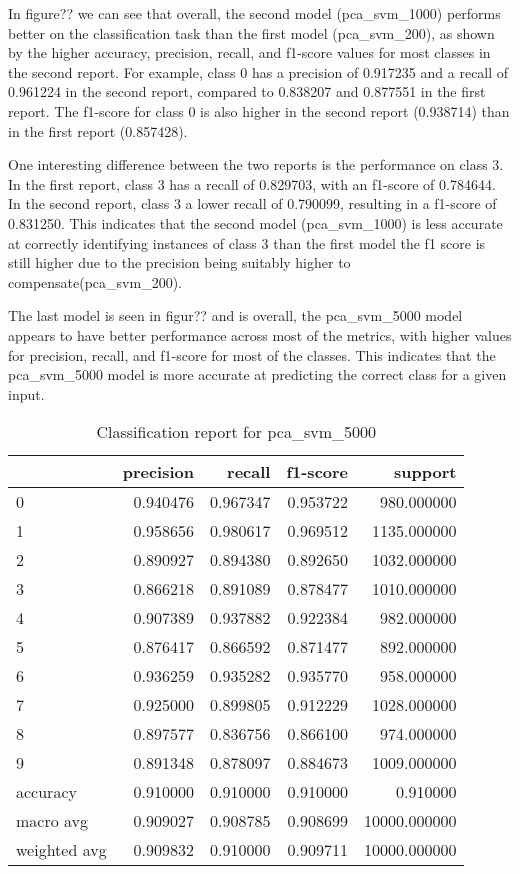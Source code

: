 In figure?? we can see that overall, the second model (pca_svm_1000) performs better on the classification task than the first model (pca_svm_200), as shown by the higher accuracy, precision, recall, and f1-score values for most classes in the second report. For example, class 0 has a precision of 0.917235 and a recall of 0.961224 in the second report, compared to 0.838207 and 0.877551 in the first report. The f1-score for class 0 is also higher in the second report (0.938714) than in the first report (0.857428).

One interesting difference between the two reports is the performance on class 3. In the first report, class 3 has a recall of 0.829703, with an f1-score of 0.784644. In the second report, class 3 a lower recall of 0.790099, resulting in a f1-score of 0.831250. This indicates that the second model (pca_svm_1000) is less accurate at correctly identifying instances of class 3 than the first model the f1 score is still higher due to the precision being suitably higher to compensate(pca_svm_200).

The last model is seen in figur?? and is overall, the pca_svm_5000 model appears to have better performance across most of the metrics, with higher values for precision, recall, and f1-score for most of the classes. This indicates that the pca_svm_5000 model is more accurate at predicting the correct class for a given input.

\begin{table}[htb!]
    \centering
    \caption{Classification report for pca_svm_5000}
    \label{tab:classification-report-pca_svm_5000}
    \begin{tabular}{lrrrr}
    \toprule
     & precision & recall & f1-score & support \\
    \midrule
    0 & 0.940476 & 0.967347 & 0.953722 & 980.000000 \\
    1 & 0.958656 & 0.980617 & 0.969512 & 1135.000000 \\
    2 & 0.890927 & 0.894380 & 0.892650 & 1032.000000 \\
    3 & 0.866218 & 0.891089 & 0.878477 & 1010.000000 \\
    4 & 0.907389 & 0.937882 & 0.922384 & 982.000000 \\
    5 & 0.876417 & 0.866592 & 0.871477 & 892.000000 \\
    6 & 0.936259 & 0.935282 & 0.935770 & 958.000000 \\
    7 & 0.925000 & 0.899805 & 0.912229 & 1028.000000 \\
    8 & 0.897577 & 0.836756 & 0.866100 & 974.000000 \\
    9 & 0.891348 & 0.878097 & 0.884673 & 1009.000000 \\
    accuracy & 0.910000 & 0.910000 & 0.910000 & 0.910000 \\
    macro avg & 0.909027 & 0.908785 & 0.908699 & 10000.000000 \\
    weighted avg & 0.909832 & 0.910000 & 0.909711 & 10000.000000 \\
    \bottomrule
    \end{tabular}
    \end{table}


